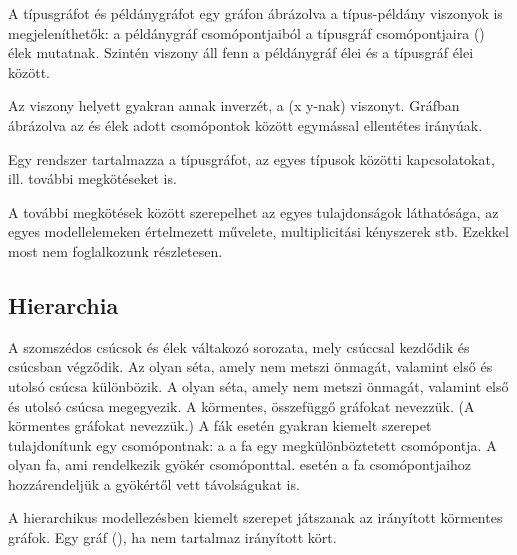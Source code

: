 A típusgráfot és példánygráfot egy gráfon ábrázolva a típus-példány viszonyok is megjeleníthetők: a példánygráf csomópontjaiból a típusgráf csomópontjaira  () élek mutatnak. Szintén  viszony áll fenn a példánygráf élei és a típusgráf élei között.%

\begin{megjegyzes}
	Az  viszony helyett gyakran annak inverzét, a  (x  y-nak) viszonyt. Gráfban ábrázolva az  és  élek adott csomópontok között egymással ellentétes irányúak.
\end{megjegyzes}


\begin{definicio}
	Egy rendszer  tartalmazza a típusgráfot, az egyes típusok közötti kapcsolatokat, ill. további megkötéseket is.
	
	\begin{megjegyzes}
		A további megkötések között szerepelhet az egyes tulajdonságok láthatósága, az egyes modellelemeken értelmezett művelete, multiplicitási kényszerek stb. Ezekkel most nem foglalkozunk részletesen.
	\end{megjegyzes}
\end{definicio}

\subsection{Hierarchia}

\begin{kisdefiniciok}
	A  szomszédos csúcsok és élek váltakozó sorozata, mely csúccsal kezdődik és csúcsban végződik. %
	Az  olyan séta, amely nem metszi önmagát, valamint első és utolsó csúcsa különbözik. A  olyan séta, amely nem metszi önmagát, valamint első és utolsó csúcsa megegyezik. %
	A körmentes, összefüggő gráfokat  nevezzük. (A körmentes gráfokat  nevezzük.)
	A fák esetén gyakran kiemelt szerepet tulajdonítunk egy csomópontnak: a  a fa egy megkülönböztetett csomópontja. A  olyan fa, ami rendelkezik gyökér csomóponttal.  esetén a fa csomópontjaihoz hozzárendeljük a gyökértől vett távolságukat is.
	
	A hierarchikus modellezésben kiemelt szerepet játszanak az irányított körmentes gráfok. Egy gráf  (), ha nem tartalmaz irányított kört.	
\end{kisdefiniciok}

